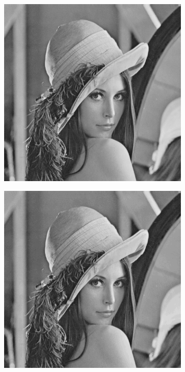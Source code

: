 \documentclass{article}
\begin{document}
\begin{figure}
\begin{subfigure}[c]{0.3\textwidth}
            \includegraphics[width=\textwidth]{images/lena-y_64.png}
        \end{subfigure}
        \hfill
        \begin{subfigure}[c]{0.3\textwidth}
            \includegraphics[width=\textwidth]{images/lena-y_32.png}

\end{subfigure}
\end{figure}
\end{document}
